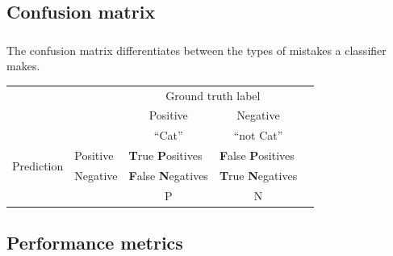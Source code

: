 \subsection{Confusion matrix}

\begin{frame}\frametitle{\subsecname}

The confusion matrix differentiates between the types of mistakes a classifier makes.

\begin{tabular}{ll|l|l|l}
\cline{3-4}
												  &          & \multicolumn{2}{c|}{Ground truth label}                        &  \\ \cline{3-4}
												  &          & \multicolumn{1}{c|}{Positive} & \multicolumn{1}{c|}{Negative}  &  \\ \cline{3-4}
												  &          & \multicolumn{1}{c|}{``Cat''} & \multicolumn{1}{c|}{``not Cat''}  &  \\ \cline{1-4}
\multicolumn{1}{|r|}{\multirow{2}{*}{Prediction}} & Positive & \textbf{T}rue \textbf{P}ositives & \textbf{F}alse \textbf{P}ositives &  \\ \cline{2-4}
\multicolumn{1}{|r|}{}                            & Negative &  \textbf{F}alse \textbf{N}egatives & \textbf{T}rue \textbf{N}egatives &  \\ \cline{1-4}
												  &          & \multicolumn{1}{c|}{P} & \multicolumn{1}{c|}{N}  &  \\ \cline{3-4}
\end{tabular}	


\end{frame}

\subsection{Performance metrics}

